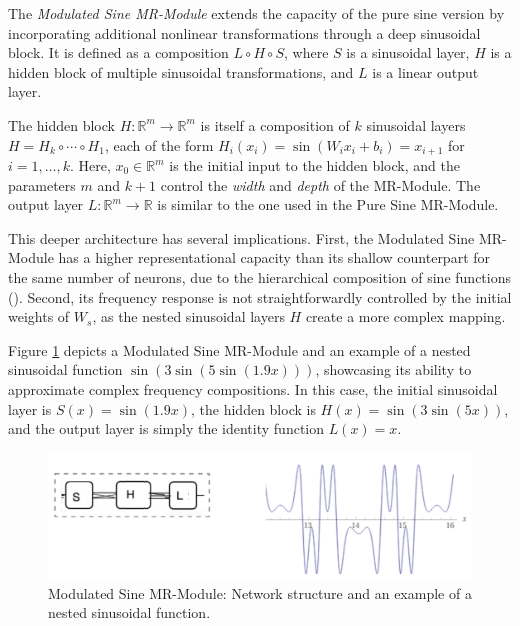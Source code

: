 The \textit{Modulated Sine MR-Module} extends the capacity of the pure sine version by incorporating additional nonlinear transformations through a deep sinusoidal block. It is defined as a composition \( L \circ H \circ S \), where \( S \) is a sinusoidal layer, \( H \) is a hidden block of multiple sinusoidal transformations, and \( L \) is a linear output layer.

The hidden block \( H\!:\!\mathbb{R}^m\!\to\! \mathbb{R}^m \) is itself a composition of \( k \) sinusoidal layers \( H = H_k \circ \cdots \circ H_1 \), each of the form \( H_i(x_i) = \sin\left(W_i x_i + b_i\right) = x_{i+1} \) for \( i = 1, \dots, k \). Here, \( x_0 \in \mathbb{R}^m \) is the initial input to the hidden block, and the parameters \( m \) and \( k + 1 \) control the \textit{width} and \textit{depth} of the MR-Module. The output layer \( L \!:\! \mathbb{R}^m \!\to\! \mathbb{R} \) is similar to the one used in the Pure Sine MR-Module.

This deeper architecture has several implications. First, the Modulated Sine MR-Module has a higher representational capacity than its shallow counterpart for the same number of neurons, due to the hierarchical composition of sine functions (\cite{novello2022understanding}). Second, its frequency response is not straightforwardly controlled by the initial weights of \( W_s \), as the nested sinusoidal layers \( H \) create a more complex mapping. 

Figure \ref{f:modulated} depicts a Modulated Sine MR-Module and an example of a nested sinusoidal function \( \sin\left( 3\sin\left(5\sin(1.9x)\right)\right) \), showcasing its ability to approximate complex frequency compositions. In this case, the initial sinusoidal layer is \( S(x) = \sin(1.9 x) \), the hidden block is \( H(x) = \sin\left(3\sin(5x)\right) \), and the output layer is simply the identity function \( L(x) = x \).

\begin{figure}[!h]
\centering
\includegraphics[width=0.9\linewidth]{img/ch4/modulated-sine.png}
\caption{Modulated Sine MR-Module: Network structure and an example of a nested sinusoidal function.}
\label{f:modulated}
\end{figure}


